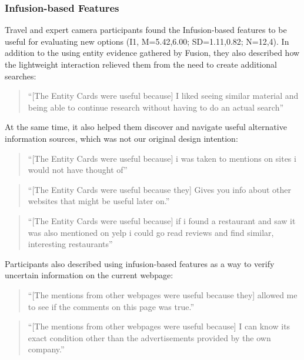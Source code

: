 \subsubsection{\textbf{Infusion-based Features}}

Travel and expert camera participants found the Infusion-based features to be useful for evaluating new options (I1, M=5.42,6.00; SD=1.11,0.82; N=12,4). In addition to the using entity evidence gathered by Fusion, they also described how the lightweight interaction relieved them from the need to create additional searches:

\begin{quote}
``[The Entity Cards were useful because] I liked seeing similar material and being able to continue research without having to do an actual search''
\end{quote}

\noindent At the same time, it also helped them discover and navigate useful alternative information sources, which was not our original design intention:

\begin{quote}
``[The Entity Cards were useful because] i was taken to mentions on sites i would not have thought of''
\end{quote}

\begin{quote}
``[The Entity Cards were useful because they] Gives you info about other websites that might be useful later on.''
\end{quote}

\begin{quote}
``[The Entity Cards were useful because] if i found a restaurant and saw it was also mentioned on yelp i could go read reviews and find similar, interesting restaurants''
\end{quote}

\noindent Participants also described using infusion-based features as a way to verify uncertain information on the current webpage:

\begin{quote}
``[The mentions from other webpages were useful because they] allowed me to see if the comments on this page was true.''
\end{quote}

\begin{quote}
``[The mentions from other webpages were useful because] I can know its exact condition other than the advertisements provided by the own company.''
\end{quote}


